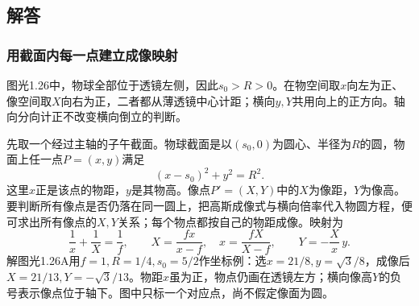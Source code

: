 \documentclass[UTF8,fontset=fandol,a4paper,11pt]{ctexart}
\begin{document}
\subsection*{解答}


\subsubsection*{用截面内每一点建立成像映射}
图光1.26中，物球全部位于透镜左侧，因此$s_0>R>0$。在物空间取$x$向左为正、像空间取$X$向右为正，二者都从薄透镜中心计距；横向$y,Y$共用向上的正方向。轴向分向计正不改变横向倒立的判断。

先取一个经过主轴的子午截面。物球截面是以$(s_0,0)$为圆心、半径为$R$的圆，物面上任一点$P=(x,y)$满足
\[
(x-s_0)^2+y^2=R^2.
\]
这里$x$正是该点的物距，$y$是其物高。像点$P'=(X,Y)$中的$X$为像距，$Y$为像高。要判断所有像点是否仍落在同一圆上，把高斯成像式与横向倍率代入物圆方程，便可求出所有像点的$X,Y$关系；每个物点都按自己的物距成像。映射为
\[
\frac1x+\frac1X=\frac1f,\qquad
X=\frac{fx}{x-f},\quad
x=\frac{fX}{X-f},\qquad
Y=-\frac Xx\,y.
\]
解图光1.26A用$f=1,R=1/4,s_0=5/2$作坐标例：选$x=21/8,y=\sqrt3/8$，成像后$X=21/13,Y=-\sqrt3/13$。物距$x$虽为正，物点仍画在透镜左方；横向像高$Y$的负号表示像点位于轴下。图中只标一个对应点，尚不假定像面为圆。
\end{document}
